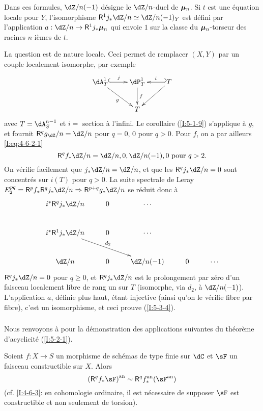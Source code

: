 Dans ces formules, $\dZ/n(-1)$ désigne le $\dZ/n$-duel de ${\bm\mu}_n$. Si $t$ 
est une équation locale pour $Y$, l'isomorphisme 
$\R^1j_*\dZ/n\simeq\dZ/n(-1)_Y$ est défini par l'application 
$a:\dZ/n\to \R^1j_*\dmu_n$ qui envoie $1$ sur la classe du ${\bm\mu}_n$-torseur des 
racines $n$-ièmes de $t$. 

La question est de nature locale. Ceci permet de remplacer $(X,Y)$ par un 
couple localement isomorphe, par exemple 
\[\xymatrix{
  \dA_T^1 \ar@{^{(}->}[r]^-j \ar[dr]_-g 
    & \dP_T^1 \ar[d]^-f 
    & \ar@{_{(}->}[l]_-i T \ar[dl] \\
  & T
}\]
avec $T=\dA_S^{n-1}$ et $i=$ section à l'infini. Le corollaire (\ref{I:5-1-9}) 
s'applique à $g$, et fournit $\R^q g_ \dZ/n=\dZ/n$ pour $q=0$, $0$ pour $q>0$. 
Pour $f$, on a par ailleurs \eqref{I:eq:4-6-2-1}
\[
  \R^q f_* \dZ/n = \dZ/n,0,\dZ/n(-1),0 \text{ pour $q>2$.}
\]
On vérifie facilement que $j_* \dZ/n = \dZ/n$, et que les $\R^q j_*\dZ/n = 0$ 
sont concentrés sur $i(T)$ pour $q>0$. La suite spectrale de Leray 
$E_2^{pq} = \R^p f_* \R^q j_*\dZ/n \Rightarrow \R^{p+q}g_* \dZ/n$ se réduit 
donc à 
\[\xymatrix{
  i^* \R^q j_* \dZ/n & 0 & \cdots \\
  i^* \R^1 j_* \dZ/n \ar[drr]^-{d_2} & 0 & \cdots \\
  \dZ/n              & 0 & \dZ/n(-1) & 0 & \cdots
}\]
$\R^q j_*\dZ/n=0$ pour $q\geqslant 0$, et $\R^q j_*\dZ/n$ est le prolongement 
par zéro d'un faisceau localement libre de rang un sur $T$ (isomorphe, via 
$d_2$, à $\dZ/n(-1)$). L'application $a$, définie plus haut, étant 
injective (ainsi qu'on le vérifie fibre par fibre), c'est un isomorphisme, et 
ceci prouve (\ref{I:5-3-4}). 





\subsubsection{}\label{I:5-3-5}

Nous renvoyons à \cite[XVI.4,5]{sga4} pour la démonstration des 
applications suivantes du théorème d'acyclicité (\ref{I:5-2-1}). 





\begin{theorem}\label{I:5-3-6} %
Soient $f:X\to S$ un morphisme de schémas de type finie sur $\dC$ et $\sF$ un 
faisceau constructible sur $X$. Alors 
\[
  \an{(\R^q f_*\sF)} \sim \R^q \an f_* (\an\sF)
\]
(cf. \ref{I:4-6-3}: en cohomologie ordinaire, il est nécessaire de supposer 
$\sF$ est constructible et non seulement de torsion). 
\end{theorem}





